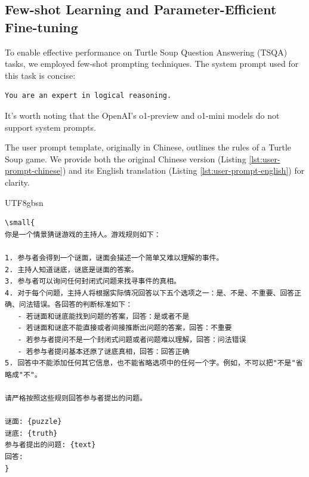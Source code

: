 \documentclass[conference]{IEEEtran}
\begin{document}
\subsection{Few-shot Learning and Parameter-Efficient Fine-tuning}

To enable effective performance on Turtle Soup Question Answering (TSQA) tasks, we employed few-shot prompting techniques. The system prompt used for this task is concise:

\begin{verbatim}
You are an expert in logical reasoning.
\end{verbatim}

It's worth noting that the OpenAI's o1-preview and o1-mini models do not support system prompts.

The user prompt template, originally in Chinese, outlines the rules of a Turtle Soup game. We provide both the original Chinese version (Listing \ref{lst:user-prompt-chinese}) and its English translation (Listing \ref{lst:user-prompt-english}) for clarity.


\begin{CJK*}{UTF8}{gbsn}
\begin{listing}[htbp]
\begin{verbatim}
\small{
你是一个情景猜谜游戏的主持人。游戏规则如下：

1. 参与者会得到一个谜面，谜面会描述一个简单又难以理解的事件。
2. 主持人知道谜底，谜底是谜面的答案。
3. 参与者可以询问任何封闭式问题来找寻事件的真相。
4. 对于每个问题，主持人将根据实际情况回答以下五个选项之一：是、不是、不重要、回答正确、问法错误。各回答的判断标准如下：
   - 若谜面和谜底能找到问题的答案，回答：是或者不是
   - 若谜面和谜底不能直接或者间接推断出问题的答案，回答：不重要
   - 若参与者提问不是一个封闭式问题或者问题难以理解，回答：问法错误
   - 若参与者提问基本还原了谜底真相，回答：回答正确
5. 回答中不能添加任何其它信息，也不能省略选项中的任何一个字。例如，不可以把"不是"省略成"不"。

请严格按照这些规则回答参与者提出的问题。

谜面: {puzzle}
谜底: {truth}
参与者提出的问题: {text}
回答: 
}
\end{verbatim}
\caption{User Prompt Template for TSQA (Chinese)}
\label{lst:user-prompt-chinese}
\end{listing}
\end{CJK*}
\end{document}
